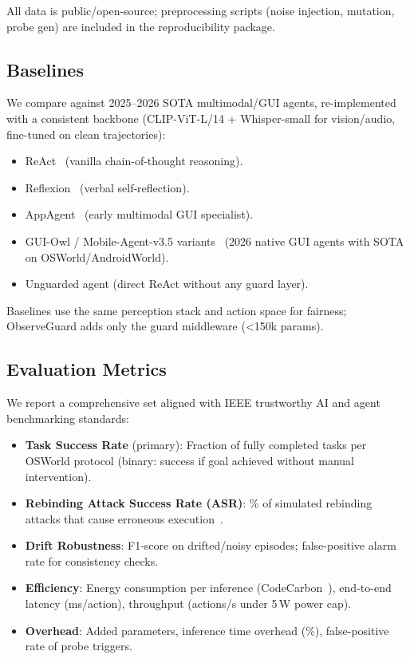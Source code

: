 All data is public/open-source; preprocessing scripts (noise injection, mutation, probe gen) are included in the reproducibility package.

\subsection{Baselines}
We compare against 2025--2026 SOTA multimodal/GUI agents, re-implemented with a consistent backbone (CLIP-ViT-L/14 + Whisper-small for vision/audio, fine-tuned on clean trajectories):

\begin{itemize}
    \item ReAct~\cite{yao2022react} (vanilla chain-of-thought reasoning).
    \item Reflexion~\cite{shinn2023reflexion} (verbal self-reflection).
    \item AppAgent~\cite{zhang2023appagent} (early multimodal GUI specialist).
    \item GUI-Owl / Mobile-Agent-v3.5 variants~\cite{mobileagentv35} (2026 native GUI agents with SOTA on OSWorld/AndroidWorld).
    \item Unguarded agent (direct ReAct without any guard layer).
\end{itemize}

Baselines use the same perception stack and action space for fairness; ObserveGuard adds only the guard middleware (<150k params).

\subsection{Evaluation Metrics}
We report a comprehensive set aligned with IEEE trustworthy AI and agent benchmarking standards:

\begin{itemize}
    \item \textbf{Task Success Rate} (primary): Fraction of fully completed tasks per OSWorld protocol (binary: success if goal achieved without manual intervention).
    \item \textbf{Rebinding Attack Success Rate (ASR)}: \% of simulated rebinding attacks that cause erroneous execution~\cite{qian2026rebinding}.
    \item \textbf{Drift Robustness}: F1-score on drifted/noisy episodes; false-positive alarm rate for consistency checks.
    \item \textbf{Efficiency}: Energy consumption per inference (CodeCarbon~\cite{codecarbon2024}), end-to-end latency (ms/action), throughput (actions/s under 5\,W power cap).
    \item \textbf{Overhead}: Added parameters, inference time overhead (\%), false-positive rate of probe triggers.
\end{itemize}

